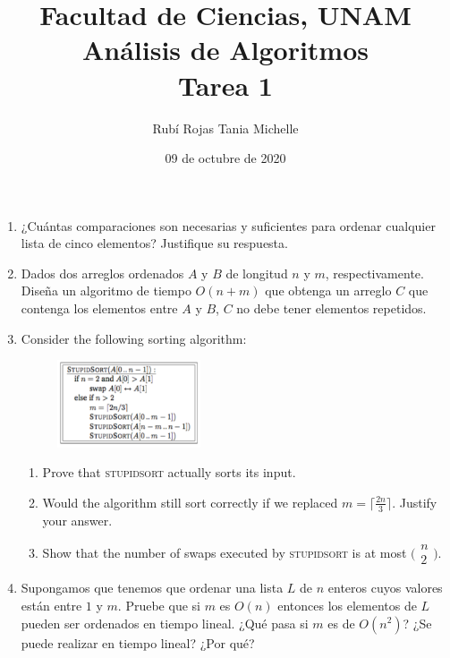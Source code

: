 \documentclass[letterpaper,11pt]{article}
\title{Facultad de Ciencias, UNAM \\ Análisis de Algoritmos \\ Tarea 1}
\author{Rubí Rojas Tania Michelle}
\date{09 de octubre de 2020}
\begin{document}
\maketitle

\begin{enumerate}
    \item ¿Cuántas comparaciones son necesarias y suficientes para ordenar 
    cualquier lista de cinco elementos? Justifique su respuesta.

    \item Dados dos arreglos ordenados $A$ y $B$ de longitud $n$ y $m$, 
    respectivamente. Diseña un algoritmo de tiempo $O(n + m)$ que obtenga un 
    arreglo $C$ que contenga los elementos entre $A$ y $B$, $C$ no debe tener 
    elementos repetidos.

    \item Consider the following sorting algorithm:
    \begin{figure}[ht]
        \centering
        \includegraphics[width=0.4\textwidth]{./imagenes/stupidSort.png}
    \end{figure}

    \begin{enumerate}
        \item Prove that \textsc{stupidsort} actually sorts its input.

        \item Would the algorithm still sort correctly if we replaced 
        $m = \lceil \frac{2n}{3}\rceil$. Justify your answer.

        \item Show that the number of swaps executed by \textsc{stupidsort} is
        at most $\big(\begin{smallmatrix} n \\ 2 \end{smallmatrix}\big)$.
    \end{enumerate}

    \item Supongamos que tenemos que ordenar una lista $L$ de $n$ enteros cuyos
    valores están entre $1$ y $m$. Pruebe que si $m$ es $O(n)$ entonces los 
    elementos de $L$ pueden ser ordenados en tiempo lineal. ¿Qué pasa si $m$ es 
    de $O(n^2)$? ¿Se puede realizar en tiempo lineal? ¿Por qué?


\end{enumerate}
\end{document}
